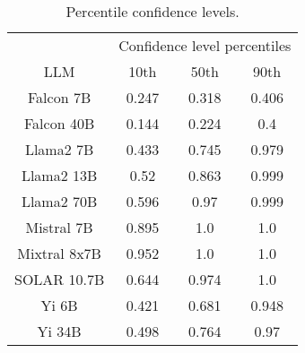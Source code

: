 \begin{table*}
\centering
\begin{tabular}{c|c|c|c}
& \multicolumn{3}{c}{Confidence level percentiles} \\ 
LLM & 10th & 50th & 90th\\ \hline
Falcon 7B & 0.247 & 0.318 & 0.406\\
Falcon 40B & 0.144 & 0.224 & 0.4\\
Llama2 7B & 0.433 & 0.745 & 0.979\\
Llama2 13B & 0.52 & 0.863 & 0.999\\
Llama2 70B & 0.596 & 0.97 & 0.999\\
Mistral 7B & 0.895 & 1.0 & 1.0\\
Mixtral 8x7B & 0.952 & 1.0 & 1.0\\
SOLAR 10.7B & 0.644 & 0.974 & 1.0\\
Yi 6B & 0.421 & 0.681 & 0.948\\
Yi 34B & 0.498 & 0.764 & 0.97\\
\hline
\end{tabular}
\caption{Percentile confidence levels.}
\label{tab:percentile_conf}
\end{table*}
